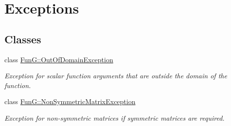 \hypertarget{group__Exceptions}{\section{\-Exceptions}
\label{group__Exceptions}
}
\subsection*{\-Classes}
\begin{DoxyCompactItemize}
\item 
class \hyperlink{classFunG_1_1OutOfDomainException}{\-Fun\-G\-::\-Out\-Of\-Domain\-Exception}
\begin{DoxyCompactList}\small\item\em \-Exception for scalar function arguments that are outside the domain of the function. \end{DoxyCompactList}\item 
class \hyperlink{classFunG_1_1NonSymmetricMatrixException}{\-Fun\-G\-::\-Non\-Symmetric\-Matrix\-Exception}
\begin{DoxyCompactList}\small\item\em \-Exception for non-\/symmetric matrices if symmetric matrices are required. \end{DoxyCompactList}\end{DoxyCompactItemize}
